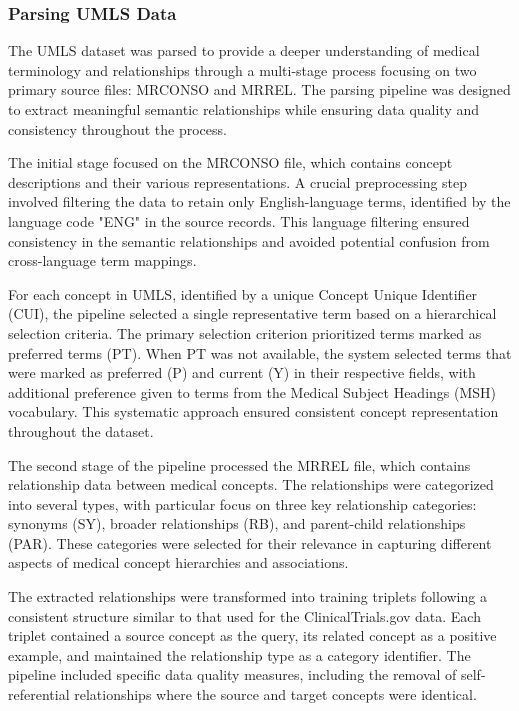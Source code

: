 \subsubsection{Parsing UMLS Data}
\label{subsubsec:parsing_umls}

The UMLS dataset was parsed to provide a deeper understanding of medical terminology and relationships through a multi-stage process focusing on two primary source files: MRCONSO and MRREL. The parsing pipeline was designed to extract meaningful semantic relationships while ensuring data quality and consistency throughout the process.

The initial stage focused on the MRCONSO file, which contains concept descriptions and their various representations. A crucial preprocessing step involved filtering the data to retain only English-language terms, identified by the language code "ENG" in the source records. This language filtering ensured consistency in the semantic relationships and avoided potential confusion from cross-language term mappings.

For each concept in UMLS, identified by a unique Concept Unique Identifier (CUI), the pipeline selected a single representative term based on a hierarchical selection criteria. The primary selection criterion prioritized terms marked as preferred terms (PT). When PT was not available, the system selected terms that were marked as preferred (P) and current (Y) in their respective fields, with additional preference given to terms from the Medical Subject Headings (MSH) vocabulary. This systematic approach ensured consistent concept representation throughout the dataset.

The second stage of the pipeline processed the MRREL file, which contains relationship data between medical concepts. The relationships were categorized into several types, with particular focus on three key relationship categories: synonyms (SY), broader relationships (RB), and parent-child relationships (PAR). These categories were selected for their relevance in capturing different aspects of medical concept hierarchies and associations.

The extracted relationships were transformed into training triplets following a consistent structure similar to that used for the ClinicalTrials.gov data. Each triplet contained a source concept as the query, its related concept as a positive example, and maintained the relationship type as a category identifier. The pipeline included specific data quality measures, including the removal of self-referential relationships where the source and target concepts were identical.

